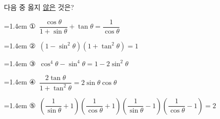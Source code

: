 다음 중 옳지 \underline{않은} 것은?
\par\medskip\par\noindent\hangindent=1.4em {\small ①}\ $\dfrac{\cos\theta}{1+\sin\theta}+\tan\theta=\dfrac{1}{\cos\theta}$\par\noindent\hangindent=1.4em {\small ②}\ $(1-\sin^2\theta)(1+\tan^2\theta)=1$\par\noindent\hangindent=1.4em {\small ③}\ $\cos^4\theta-\sin^4\theta=1-2\sin^2\theta$\par\noindent\hangindent=1.4em {\small ④}\ $\dfrac{2\tan\theta}{1+\tan^2\theta}=2\sin\theta\cos\theta$\par\noindent\hangindent=1.4em {\small ⑤}\ $\left(\dfrac{1}{\sin\theta}+1\right)\left(\dfrac{1}{\cos\theta}+1\right)\left(\dfrac{1}{\sin\theta}-1\right)\left(\dfrac{1}{\cos\theta}-1\right)=2$\par\medskip
